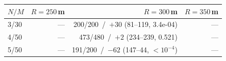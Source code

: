 \begin{tabular}{lrrr}
\toprule
$N/M$ & $R=250$\,m & $R=300$\,m & $R=350$\,m \\
\midrule
3/30 & --- & 200/200 \,/\, $+30$ (81--119, 3.4e-04) & --- \\
4/50 & --- & 473/480 \,/\, $+2$ (234--239, 0.521) & --- \\
5/50 & --- & 191/200 \,/\, $-62$ (147--44, $<10^{-4}$) & --- \\
\bottomrule
\end{tabular}%
